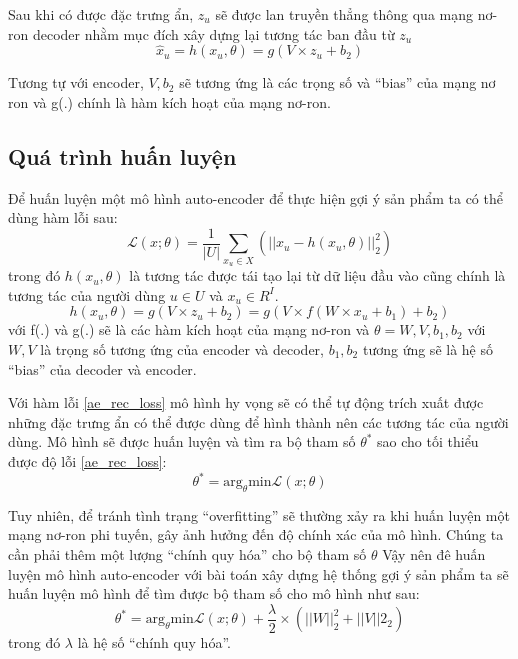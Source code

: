     Sau khi có được đặc trưng ẩn, $z_u$ sẽ được lan truyền thẳng thông qua mạng nơ-ron decoder nhằm mục đích xây dựng lại tương tác ban đầu từ $z_u$
    \begin{equation}
        \widehat{x}_u = h(x_u,\theta) = g(V \times z_u + b_2)
    \end{equation}

    Tương tự với encoder, $V,b_2$ sẽ tương ứng là các trọng số và ``bias'' của mạng nơ ron và g(.) chính là hàm kích hoạt của mạng nơ-ron.

    \subsection{Quá trình huấn luyện}
    
    Để huấn luyện một mô hình auto-encoder để thực hiện gợi ý sản phẩm ta có thể dùng hàm lỗi sau:
    \begin{equation}
        \label{ae_rec_loss}
        \mathcal{L}(x;\theta) = \frac {1}{|U|}\sum_{x_u \in X}(||x_u - h(x_u,\theta)||^2_2)
    \end{equation}
    trong đó $h(x_u,\theta)$ là tương tác được tái tạo lại từ dữ liệu đầu vào cũng chính là tương tác của người dùng $u \in U$ và $x_u \in R^I$.
    \begin{equation}
        h(x_u,\theta) = g(V \times z_u + b_2) = g(V \times f(W \times x_u + b_1) + b_2)
    \end{equation}    
    với f(.) và g(.) sẽ là các hàm kích hoạt của mạng nơ-ron và $\theta = {W, V, b_1, b_2}$ với $W,V$ là trọng số tương ứng của encoder và decoder, $b_1,b_2$ tương ứng sẽ là hệ số ``bias'' của decoder và encoder.
    
    Với hàm lỗi \ref{ae_rec_loss} mô hình hy vọng sẽ có thể tự động trích xuất được những đặc trưng ẩn có thể được dùng để hình thành nên các tương tác của người dùng.
    Mô hình sẽ được huấn luyện và tìm ra bộ tham số $\theta^*$ sao cho tối thiểu được độ lỗi \ref{ae_rec_loss}: 
    \begin{equation}
        \theta^* = \text{arg}_\theta \text{min}  \mathcal{L}(x;\theta)
    \end{equation}    
    

    Tuy nhiên, để tránh tình trạng ``overfitting'' sẽ thường xảy ra khi huấn luyện một mạng nơ-ron phi tuyến, gây ảnh hưởng đến độ chính xác của mô hình. 
    Chúng ta cần phải thêm một lượng ``chính quy hóa'' cho bộ tham số $\theta$   
    Vậy nên đê huấn luyện mô hình auto-encoder với bài toán xây dựng hệ thống gợi ý sản phẩm ta sẽ huấn luyện mô hình để tìm được bộ tham số cho mô hình  như sau:
    \begin{equation}
        \label{ae_rec_obj}
        \theta^* = \text{arg}_\theta \text{min}  \mathcal{L}(x;\theta)  + \frac \lambda 2 \times (||W||^2_2 + ||V||2_2)
    \end{equation}
    trong đó $\lambda$ là hệ số ``chính quy hóa''.

